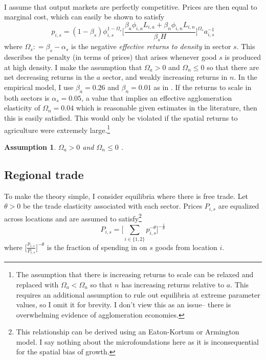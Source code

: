 \documentclass[]{article}
\theoremstyle{plain}
\newtheorem{assumption}{Assumption}
\begin{document}
\paragraph*{}
I assume that output markets are perfectly competitive. Prices are then equal to marginal cost, which can easily be shown to satisfy 
\begin{equation}\label{pindex}
p_{i,s} = (1-\beta_{s})\phi_{i,s}^{1-\Omega_{s}}\bigg[ \frac{\beta_{a}\phi_{i,a}L_{i, a} + \beta_{n}\phi_{i,n}L_{i, n}}{\beta_{s}H}\bigg]^{\Omega_{s}}a_{i,s}^{-1}
\end{equation}
where $\Omega_{s} : = \beta_{s} - \alpha_{s}$ is the negative \textit{effective returns to density} in sector $s$. This describes the penalty (in terms of prices) that arises whenever good $s$ is produced at high density. I make the assumption that $\Omega_{a} > 0$ and $\Omega_{n}  \leq 0$ so that there are net decreasing returns in the $a$ sector, and weakly increasing returns in $n$. In the empirical model, I use $\beta_{a} = 0.26$ and $\beta_{n} = 0.01$ as in \cite{hao2020}. If the returns to scale in both sectors is $\alpha_{s} = 0.05$, a value that implies an effective agglomeration elasticity of $\Omega_{n} = 0.04$ which is reasonable given estimates in the literature, then this is easily satisfied. This would only be violated if the spatial returns to agriculture were extremely large.\footnote{The assumption that there is increasing returns to scale can be relaxed and replaced with $\Omega_{a} < \Omega_{n}$ so that $n$ has increasing returns relative to $a$. This requires an additional assumption to rule out equilibria at extreme parameter values, so I omit it for brevity. I don't view this as an issue-- there is overwhelming evidence of agglomeration economies.} 
\begin{assumption}\label{assump:spatialreturns}
 $\Omega_{a} > 0$ and $\Omega_{n} \leq 0$ .
\end{assumption}

\subsection*{Regional trade}
To make the theory simple, I consider equilibria where there is free trade. Let $\theta > 0$ be the trade elasticity associated with each sector. Prices $P_{i, s}$ are equalized across locations and are assumed to satisfy\footnote{This relationship can be derived using an Eaton-Kortum or Armington model. I say nothing about the microfoundations here as it is inconsequential for the spatial bias of growth.}
\begin{equation*}
	P_{i, s} = \bigg[\sum_{i \in \{1, 2\}}p_{i, s}^{-\theta}\bigg]^{-\frac{1}{\theta}}
\end{equation*}
where $\bigg[\frac{p_{i, s}}{P_{i, s}}\bigg]^{-\theta}$ is the fraction of spending in on $s$ goods from location $i$.  
\end{document}
